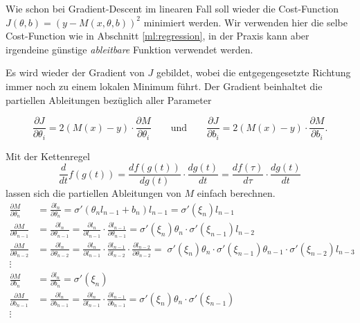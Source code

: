 Wie schon bei Gradient-Descent im linearen Fall soll wieder die Cost-Function $J(\theta,b)
= (y - M(x, \theta, b))^2$ minimiert werden. Wir verwenden hier die selbe Cost-Function
wie in Abschnitt \ref{ml:regression}, in der Praxis kann aber irgendeine günstige
\emph{ableitbare} Funktion verwendet werden.

Es wird wieder der Gradient von $J$ gebildet, wobei die entgegengesetzte Richtung immer
noch zu einem lokalen Minimum führt. Der Gradient beinhaltet die partiellen Ableitungen
bezüglich aller Parameter

\begin{equation}
    \frac{\partial J}{\partial \theta_i} = 2(M(x) - y) \cdot \frac{\partial M}{\partial \theta_i}
    \qquad\text{und}\qquad
    \frac{\partial J}{\partial b_i} = 2(M(x) - y) \cdot \frac{\partial M}{\partial b_i}.
\end{equation}

Mit der Kettenregel
\begin{equation}
    \frac{d}{dt}f(g(t)) = \frac{df(g(t))}{d g(t)} \cdot \frac{d g(t)}{dt} = \frac{df(\tau)}{d \tau} \cdot \frac{d g(t)}{dt}
\end{equation}
lassen sich die partiellen Ableitungen von $M$ einfach berechnen.
\[
\begin{aligned}
    \frac{\partial M}{\partial \theta_n} &= \frac{\partial l_n}{\partial \theta_n} =
    \sigma'(\theta_n l_{n-1} + b_n) l_{n-1} = \sigma'(\xi_n)l_{n-1} \\
    \frac{\partial M}{\partial \theta_{n-1}} &= \frac{\partial l_{n}}{\partial \theta_{n-1}}
    = \frac{\partial l_n}{\partial l_{n-1}} \cdot \frac{\partial
    l_{n-1}}{\partial \theta_{n-1}} = 
    \sigma'(\xi_n) \theta_n \cdot \sigma'(\xi_{n-1}) l_{n-2}
    \\
    \frac{\partial M}{\partial \theta_{n-2}} &= \frac{\partial l_{n}}{\partial \theta_{n-2}}
    = \frac{\partial l_n}{\partial l_{n-1}} \cdot \frac{\partial
    l_{n-1}}{\partial l_{n-2}}\cdot \frac{\partial l_{n-2}}{\partial \theta_{n-2}} =
    \; \sigma'(\xi_n)\theta_n \cdot \sigma'(\xi_{n-1})\theta_{n-1}\cdot \sigma'(\xi_{n-2})l_{n-3}
    \\
    \vdots\quad&\\
    \frac{\partial M}{\partial b_n} &= \frac{\partial l_n}{\partial b_n} =
    \sigma'(\xi_n) \\
    \frac{\partial M}{\partial b_{n-1}} &= \frac{\partial l_{n}}{\partial b_{n-1}}
    = \frac{\partial l_n}{\partial l_{n-1}} \cdot \frac{\partial
    l_{n-1}}{\partial b_{n-1}} = 
    \sigma'(\xi_n) \theta_n \cdot \sigma'(\xi_{n-1}) \\
    \vdots\quad&
\end{aligned}
\]

